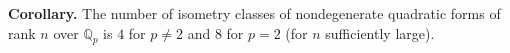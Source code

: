 \textbf{Corollary.} The number of isometry classes of nondegenerate quadratic forms of rank $n$ over $\mathbb{Q}_p$ is $4$ for $p \neq 2$ and $8$ for $p = 2$ (for $n$ sufficiently large).
